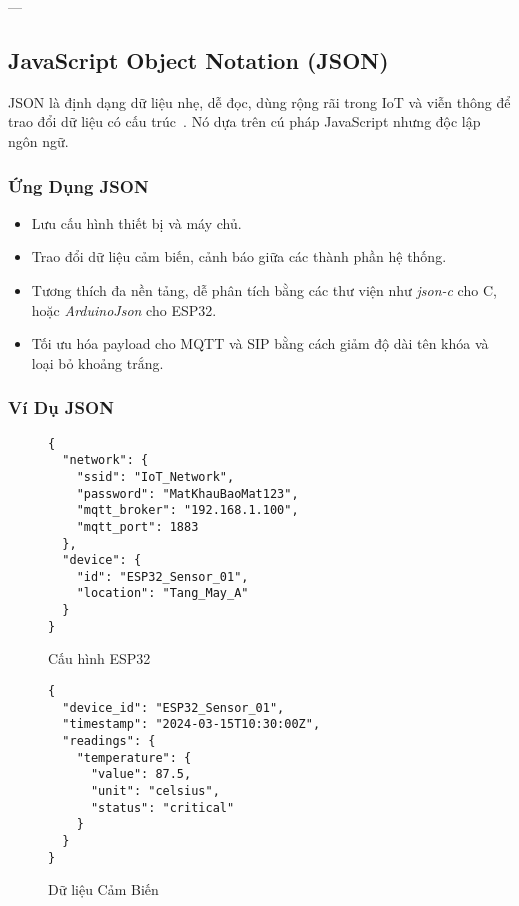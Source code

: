 ---

\subsection{JavaScript Object Notation (JSON)}
\label{subsec:json_format}

JSON là định dạng dữ liệu nhẹ, dễ đọc, dùng rộng rãi trong IoT và viễn thông để trao đổi dữ liệu có cấu trúc~\cite{json_rfc8259}. Nó dựa trên cú pháp JavaScript nhưng độc lập ngôn ngữ.

\subsubsection{Ứng Dụng JSON}
\label{subsubsec:json_applications}

\begin{itemize}
\item Lưu cấu hình thiết bị và máy chủ.
\item Trao đổi dữ liệu cảm biến, cảnh báo giữa các thành phần hệ thống.
\item Tương thích đa nền tảng, dễ phân tích bằng các thư viện như \textit{json-c} cho C, hoặc \textit{ArduinoJson} cho ESP32.
\item Tối ưu hóa payload cho MQTT và SIP bằng cách giảm độ dài tên khóa và loại bỏ khoảng trắng.
\end{itemize}

\subsubsection{Ví Dụ JSON}
\label{subsubsec:json_examples}

\begin{figure}[H]
\centering
\begin{verbatim}
{
  "network": {
    "ssid": "IoT_Network",
    "password": "MatKhauBaoMat123",
    "mqtt_broker": "192.168.1.100",
    "mqtt_port": 1883
  },
  "device": {
    "id": "ESP32_Sensor_01",
    "location": "Tang_May_A"
  }
}
\end{verbatim}
\caption{Cấu hình ESP32}
\label{fig:json_esp32_config}
\end{figure}

\begin{figure}[H]
\centering
\begin{verbatim}
{
  "device_id": "ESP32_Sensor_01",
  "timestamp": "2024-03-15T10:30:00Z",
  "readings": {
    "temperature": {
      "value": 87.5,
      "unit": "celsius",
      "status": "critical"
    }
  }
}
\end{verbatim}
\caption{Dữ liệu Cảm Biến}
\label{fig:json_sensor_data}
\end{figure}

